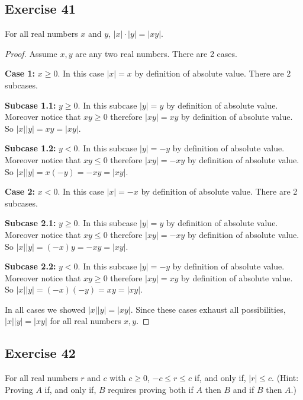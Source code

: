 \documentclass[14pt]{extarticle}
\begin{document}
\subsection{Exercise 41}
For all real numbers $x$ and $y$, $|x| \cdot |y| = |xy|$.

\begin{proof}
    Assume $x,y$ are any two real numbers. There are 2 cases.

        {\bf Case 1:} $x \geq 0$. In this case $|x| = x$ by definition of absolute value. There are 2 subcases.

        {\bf Subcase 1.1:} $y \geq 0$. In this subcase $|y| = y$ by definition of absolute value. Moreover notice that $xy \geq 0$ therefore $|xy| = xy$ by definition of absolute value. So $|x||y| = xy = |xy|$.

        {\bf Subcase 1.2:} $y < 0$. In this subcase $|y| = -y$ by definition of absolute value. Moreover notice that $xy \leq 0$ therefore $|xy| = -xy$ by definition of absolute value. So $|x||y| = x(-y) = -xy = |xy|$.

        {\bf Case 2:} $x < 0$. In this case $|x| = -x$ by definition of absolute value. There are 2 subcases.

        {\bf Subcase 2.1:} $y \geq 0$. In this subcase $|y| = y$ by definition of absolute value. Moreover notice that $xy \leq 0$ therefore $|xy| = -xy$ by definition of absolute value. So $|x||y| = (-x)y = -xy = |xy|$.

        {\bf Subcase 2.2:} $y < 0$. In this subcase $|y| = -y$ by definition of absolute value. Moreover notice that $xy \geq 0$ therefore $|xy| = xy$ by definition of absolute value. So $|x||y| = (-x)(-y) = xy = |xy|$.

    In all cases we showed $|x||y| = |xy|$. Since these cases exhaust all possibilities, $|x||y| = |xy|$ for all real numbers $x,y$.
\end{proof}

\subsection{Exercise 42}
For all real numbers $r$ and $c$ with $c \geq 0$, $-c \leq r \leq c$ if, and only if, $|r| \leq c$. (Hint: Proving $A$ if, and only if, $B$ requires proving both if $A$ then $B$ and if $B$ then $A$.)
\end{document}
